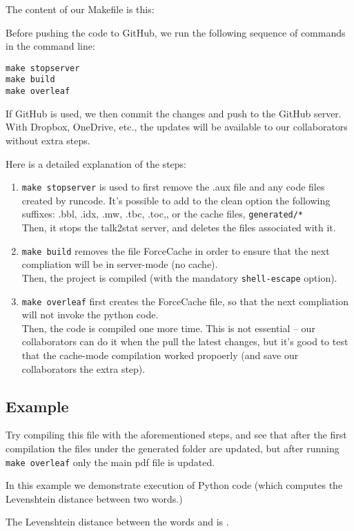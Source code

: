 \documentclass[12pt]{article}
\begin{document}
The content of our Makefile is this:

Before pushing the code to GitHub, we run the following sequence of commands in the command line:
\begin{tcolorbox}
\begin{Verbatim}
make stopserver
make build
make overleaf
\end{Verbatim}
\end{tcolorbox}
If GitHub is used, we then commit the changes and push to the GitHub server. With Dropbox, OneDrive, etc., the updates will be available to our collaborators without extra steps.

Here is a detailed explanation of the steps:
\begin{enumerate}
 \item \verb|make stopserver| is used to first remove the .aux file and any code files created by runcode. It's possible to add to the clean option the following suffixes: .bbl, .idx, .mw, .tbc, .toc,, or the cache files, \verb|generated/*|\\
 Then, it stops the talk2stat server, and deletes the files associated with it.
 \item \verb|make build| removes the file ForceCache in order to ensure that the next compliation will be in server-mode (no cache).\\
 Then, the project is compiled (with the mandatory \verb|shell-escape| option).
 \item \verb|make overleaf| first creates the ForceCache file, so that the next compliation will not invoke the python code.\\
 Then, the code is compiled one more time. This is not essential -- our collaborators can do it when the pull the latest changes, but it's good to test that the cache-mode compilation worked propoerly (and save our collaborators the extra step).
\end{enumerate}


\subsection*{Example}
Try compiling this file with the aforementioned steps, and see that after the first compilation the files under the generated folder are updated, but after running \verb|make overleaf| only the main pdf file is updated.

In this example we demonstrate execution of Python code (which computes the Levenshtein distance between two words.)


The Levenshtein distance between the words  and  is .
\end{document}
